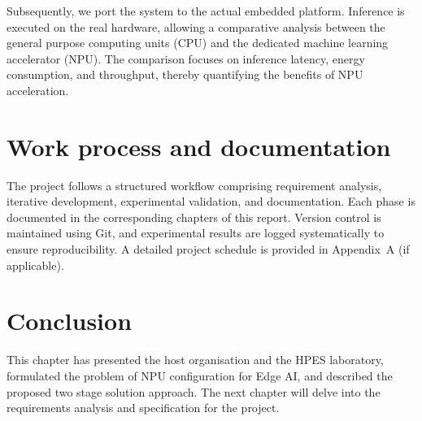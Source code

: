 Subsequently, we port the system to the actual embedded platform. Inference is executed on the real hardware, allowing a comparative analysis between the general purpose computing units (CPU) and the dedicated machine learning accelerator (NPU). The comparison focuses on inference latency, energy consumption, and throughput, thereby quantifying the benefits of NPU acceleration.

\section{Work process and documentation}
The project follows a structured workflow comprising requirement analysis, iterative development, experimental validation, and documentation. Each phase is documented in the corresponding chapters of this report. Version control is maintained using Git, and experimental results are logged systematically to ensure reproducibility. A detailed project schedule is provided in Appendix~A (if applicable).

\section*{Conclusion}
This chapter has presented the host organisation and the HPES laboratory, formulated the problem of NPU configuration for Edge AI, and described the proposed two stage solution approach. The next chapter will delve into the requirements analysis and specification for the project.